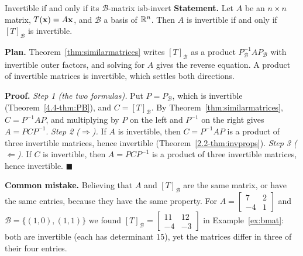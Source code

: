 \documentclass[11pt]{article}
\begin{document}
\begin{exmp}{Invertible if and only if its $\mathcal{B}$-matrix is}{b-invert}
\textbf{Statement.} Let $A$ be an $n\times n$ matrix, $T(\mathbf{x})=A\mathbf{x}$, and $\mathcal{B}$ a basis of $\mathbb{R}^n$. Then $A$ is invertible if and only if $[T]_{\mathcal{B}}$ is invertible.

\textbf{Plan.} Theorem~\ref{thm:similarmatrices} writes $[T]_{\mathcal{B}}$ as a product $P_{\mathcal{B}}^{-1}AP_{\mathcal{B}}$ with invertible outer factors, and solving for $A$ gives the reverse equation. A product of invertible matrices is invertible, which settles both directions.

\textbf{Proof.}
\emph{Step 1 (the two formulas).} Put $P=P_{\mathcal{B}}$, which is invertible (Theorem~\ref{4.4-thm:PB}), and $C=[T]_{\mathcal{B}}$. By Theorem~\ref{thm:similarmatrices}, $C=P^{-1}AP$, and multiplying by $P$ on the left and $P^{-1}$ on the right gives $A=PCP^{-1}$.
\emph{Step 2 ($\Rightarrow$).} If $A$ is invertible, then $C=P^{-1}AP$ is a product of three invertible matrices, hence invertible (Theorem~\ref{2.2-thm:invprops}).
\emph{Step 3 ($\Leftarrow$).} If $C$ is invertible, then $A=PCP^{-1}$ is a product of three invertible matrices, hence invertible. \qquad$\blacksquare$

\textbf{Common mistake.} Believing that $A$ and $[T]_{\mathcal{B}}$ are the same matrix, or have the same entries, because they have the same property. For $A=\begin{bmatrix}7&2\\-4&1\end{bmatrix}$ and $\mathcal{B}=\{(1,0),(1,1)\}$ we found $[T]_{\mathcal{B}}=\begin{bmatrix}11&12\\-4&-3\end{bmatrix}$ in Example~\ref{ex:bmat}: both are invertible (each has determinant $15$), yet the matrices differ in three of their four entries.
\end{exmp}
\end{document}
